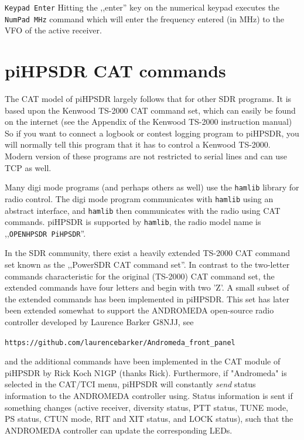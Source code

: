 \documentclass[12pt]{book}
\def\rett#1{\texttt{\color{red}#1}}
\def\bltt#1{\texttt{\color{blue}#1}}
\def\pH{pi\-HPSDR\xspace}
\begin{document}
\rett{Keypad Enter} Hitting the ,,enter'' key on the numerical keypad executes the \bltt{NumPad MHz}
command which will enter the frequency entered (in MHz) to the VFO of the active receiver.


\chapter{\pH CAT commands}
\label{sec:catcommands}
The CAT model of \pH largely follows that for other SDR programs. It is based upon the Kenwood TS-2000
CAT command
set, which can easily be found on the internet (see the Appendix of the Kenwood TS-2000 instruction manual)
So if you want to connect a logbook
or contest logging program to \pH, you will normally tell this program that it has to control a Kenwood
TS-2000. Modern version of these programs are not restricted to serial lines and can use TCP as well.

Many digi mode programs (and perhaps others as well) use the \texttt{hamlib} library for radio control. The digi mode
program communicates with \texttt{hamlib} using an abstract interface, and \texttt{hamlib} then communicates with the radio
using CAT commands. \pH is supported by \texttt{hamlib}, the radio model name is ,,\texttt{OPENHPSDR PiHPSDR}''.

In the SDR community, there exist a heavily extended TS-2000 CAT command set known as the ,,PowerSDR CAT
command set''. In contrast to the two-letter commands characteristic for the original (TS-2000) CAT
command set, the extended commands have four letters and begin with two 'Z'.
A small subset of the extended commands  has been implemented in \pH. This set has later been extended
somewhat to support the  ANDROMEDA open-source radio controller developed by Laurence Barker G8NJJ, see

\texttt{https://github.com/laurencebarker/Andromeda\_front\_panel}

and the additional commands have been implemented in
the CAT module of \pH by Rick Koch N1GP (thanks Rick).
Furthermore, if "Andromeda" is selected in the CAT/TCI menu,
\pH will constantly
\textit{send} status information to the ANDROMEDA controller using. Status information is
sent if something
changes (active receiver,  diversity status, PTT status, TUNE mode, PS status, CTUN mode, RIT and XIT
status, and LOCK status),
such that the ANDROMEDA controller can update the corresponding LEDs.
\end{document}
